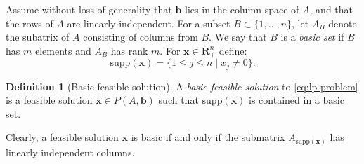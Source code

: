 \documentclass{amsbook}
\newcommand{\xx}{\mathbf x}
\newcommand{\bb}{\mathbf b}
\newcommand{\supp}{\mathrm{supp}}
\newcommand{\RR}{\mathbf R}
\theoremstyle{definition}
\newtheorem{definition}[theorem]{Definition}
\theoremstyle{remark}
\begin{document}
Assume without loss of generality that $\bb$ lies in the column space of $A$, and that the rows of $A$ are linearly independent.
For a subset $B\subset \{1,\dotsc,n\}$, let $A_B$ denote the subatrix of $A$ consisting of columns from $B$.
We say that $B$ is a \emph{basic set} if $B$ has $m$ elements and $A_B$ has rank $m$.
For $\xx\in \RR_+^n$ define:
\begin{displaymath}
  \supp(\xx)=\{1\leq j\leq n\mid x_j\neq 0\}.
\end{displaymath}
\begin{definition}
  [Basic feasible solution]
  A \emph{basic feasible solution} to \eqref{eq:lp-problem} is a feasible solution $\xx\in P(A,\bb)$ such that $\supp(\xx)$ is contained in a basic set.
\end{definition}
Clearly, a feasible solution $\xx$ is basic if and only if the submatrix $A_{\supp(\xx)}$ has linearly independent columns.
\end{document}
